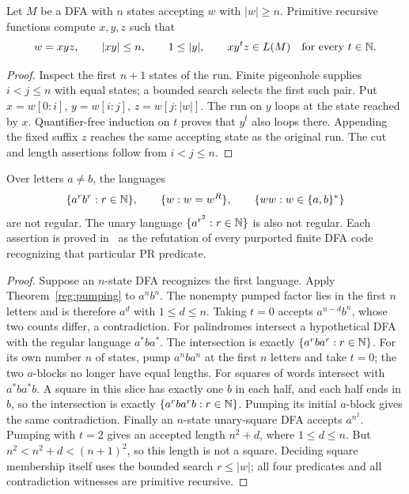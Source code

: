\begin{theorem}\label{reg:pumping}
Let $M$ be a DFA with $n$ states accepting $w$ with $|w|\geq n$.  Primitive
recursive functions compute $x,y,z$ such that
\[
 w=xyz,\qquad |xy|\leq n,\qquad 1\leq|y|,\qquad
 xy^tz\in L(M)\quad\hbox{for every }t\in\mathbb N.
\]
\end{theorem}
\begin{proof}
Inspect the first $n+1$ states of the run.  Finite pigeonhole supplies
$i<j\leq n$ with equal states; a bounded search selects the first such
pair.  Put $x=w[0:i]$, $y=w[i:j]$, $z=w[j:|w|]$.  The run on $y$ loops
at the state reached by $x$.  Quantifier-free induction on $t$ proves
that $y^t$ also loops there.  Appending the fixed suffix $z$ reaches the
same accepting state as the original run.  The cut and length assertions
follow from $i<j\leq n$.
\end{proof}

\begin{corollary}\label{reg:nonregular}
Over letters $a\ne b$, the languages
\[
 \{a^rb^r:r\in\mathbb N\},\qquad
 \{w:w=w^R\},\qquad
 \{ww:w\in\{a,b\}^*\}
\]
are not regular.  The unary language $\{a^{r^2}:r\in\mathbb N\}$ is also not
regular.  Each assertion is proved in \ipra\ as the refutation of every
purported finite DFA code recognizing that particular PR predicate.
\end{corollary}
\begin{proof}
Suppose an $n$-state DFA recognizes the first language.  Apply
Theorem~\ref{reg:pumping} to $a^nb^n$.  The nonempty pumped factor lies
in the first $n$ letters and is therefore $a^d$ with $1\leq d\leq n$.
Taking $t=0$ accepts $a^{n-d}b^n$, whose two counts differ, a contradiction.
For palindromes intersect a hypothetical DFA with the regular language
$a^*ba^*$.  The intersection is exactly $\{a^rba^r:r\in\mathbb N\}$.
For its own number $n$ of states, pump $a^nba^n$ at the first $n$ letters
and take $t=0$; the two $a$-blocks no longer have equal lengths.
For squares of words intersect with $a^*ba^*b$.  A square in this slice
has exactly one $b$ in each half, and each half ends in $b$, so the
intersection is exactly $\{a^rba^rb:r\in\mathbb N\}$.  Pumping its initial
$a$-block gives the same contradiction.
Finally an $n$-state unary-square DFA accepts $a^{n^2}$.  Pumping with
$t=2$ gives an accepted length $n^2+d$, where $1\leq d\leq n$.
But $n^2<n^2+d<(n+1)^2$, so this length is not a square.  Deciding square
membership itself uses the bounded search $r\leq|w|$; all four predicates
and all contradiction witnesses are primitive recursive.
\end{proof}

